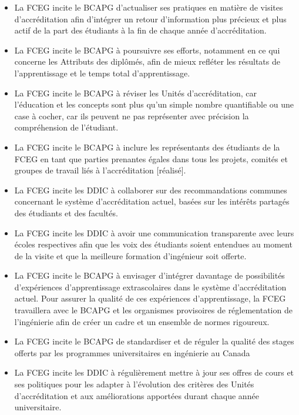 \begin{itemize}
 \item La FCEG incite le BCAPG d'actualiser ses pratiques en matière de visites d'accréditation afin d'intégrer un retour d'information plus précieux et plus actif de la part des étudiants à la fin de chaque année d'accréditation.
 \item La FCEG incite le BCAPG à poursuivre ses efforts, notamment en ce qui concerne les Attributs des diplômés, afin de mieux refléter les résultats de l'apprentissage et le temps total d'apprentissage.
 \item La FCEG incite le BCAPG à réviser les Unités d'accréditation, car l'éducation et les concepts sont plus qu'un simple nombre quantifiable ou une case à cocher, car ils peuvent ne pas représenter avec précision la compréhension de l'étudiant.
 \item La FCEG incite le BCAPG à inclure les représentants des étudiants de la FCEG en tant que parties prenantes égales dans tous les projets, comités et groupes de travail liés à l'accréditation [réalisé].
 \item La FCEG incite les DDIC à collaborer sur des recommandations communes concernant le système d'accréditation actuel, basées sur les intérêts partagés des étudiants et des facultés.
 \item La FCEG incite les DDIC à avoir une communication transparente avec leurs écoles respectives afin que les voix des étudiants soient entendues au moment de la visite et que la meilleure formation d'ingénieur soit offerte.
 \item La FCEG incite le BCAPG à envisager d'intégrer davantage de possibilités d'expériences d'apprentissage extrascolaires dans le système d'accréditation actuel. Pour assurer la qualité de ces expériences d'apprentissage, la FCEG travaillera avec le BCAPG et les organismes provisoires de réglementation de l'ingénierie afin de créer un cadre et un ensemble de normes rigoureux.
 \item La FCEG incite le BCAPG de standardiser et de réguler la qualité des stages offerts par les programmes universitaires en ingénierie au Canada
 \item La FCEG incite les DDIC à régulièrement mettre à jour ses offres de cours et ses politiques pour les adapter à l'évolution des critères des Unités d'accréditation et aux améliorations apportées durant chaque année universitaire.
\end{itemize}

